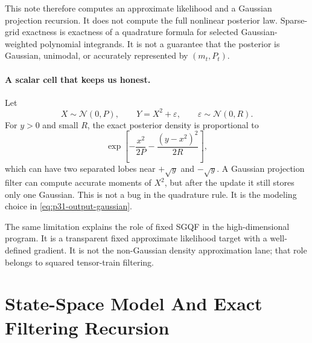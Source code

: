 \documentclass[11pt]{article}
\numberwithin{equation}{section}
\newcommand{\N}{\mathcal N}
\begin{document}
This note therefore computes an approximate likelihood and a Gaussian
projection recursion.  It does not compute the full nonlinear posterior law.
Sparse-grid exactness is exactness of a quadrature formula for selected
Gaussian-weighted polynomial integrands.  It is not a guarantee that the
posterior is Gaussian, unimodal, or accurately represented by \((m_t,P_t)\).

\paragraph{A scalar cell that keeps us honest.}
Let
\begin{equation}
  X\sim\N(0,P),\qquad Y=X^2+\varepsilon,\qquad
  \varepsilon\sim\N(0,R).
  \label{eq:p31-quadratic-cell}
\end{equation}
For \(y>0\) and small \(R\), the exact posterior density is proportional to
\begin{equation}
  \exp\!\left[-\frac{x^2}{2P}
  -\frac{(y-x^2)^2}{2R}\right],
  \label{eq:p31-quadratic-posterior}
\end{equation}
which can have two separated lobes near \(+\sqrt y\) and \(-\sqrt y\).  A
Gaussian projection filter can compute accurate moments of \(X^2\), but after
the update it still stores only one Gaussian.  This is not a bug in the
quadrature rule.  It is the modeling choice in \eqref{eq:p31-output-gaussian}.

The same limitation explains the role of fixed SGQF in the high-dimensional
program.  It is a transparent fixed approximate likelihood target with a
well-defined gradient.  It is not the non-Gaussian density approximation lane;
that role belongs to squared tensor-train filtering.

\section{State-Space Model And Exact Filtering Recursion}
\label{sec:p31-ssm}
\end{document}
